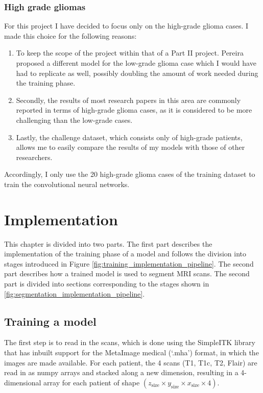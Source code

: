 \documentclass[12pt,a4paper,twoside,openright]{report}
\begin{document}
\subsection{High grade gliomas}
For this project I have decided to focus only on the high-grade glioma cases. I made this choice for the following reasons:
\begin{enumerate}
	\item To keep the scope of the project within that of a Part II project. Pereira proposed a different model for the low-grade glioma case which I would have had to replicate as well, possibly doubling the amount of work needed during the training phase.
	\item Secondly, the results of most research papers in this area are commonly reported in terms of high-grade glioma cases, as it is considered to be more challenging than the low-grade cases. 
	\item Lastly, the challenge dataset, which consists only of high-grade patients, allows me to easily compare the results of my models with those of other researchers. 
\end{enumerate}
Accordingly, I only use the 20 high-grade glioma cases of the training dataset to train the convolutional neural networks.

\chapter{Implementation}
This chapter is divided into two parts. The first part describes the implementation of the training phase of a model and follows the division into stages introduced in Figure \ref{fig:training_implementation_pipeline}. The second part describes how a trained model is used to segment MRI scans. The second part is divided into sections corresponding to the stages shown in \ref{fig:segmentation_implementation_pipeline}.

\section{Training a model}
The first step is to read in the scans, which is done using the SimpleITK library that has inbuilt support for the MetaImage medical (`.mha') format, in which the images are made available. For each patient, the 4 scans (T1, T1c, T2, Flair) are read in as numpy arrays and stacked along a new dimension, resulting in a 4-dimensional array for each patient of shape $(z_{\text{size}} \times y_{\text{size}} \times x_{\text{size}} \times 4)$.
 
\end{document}
